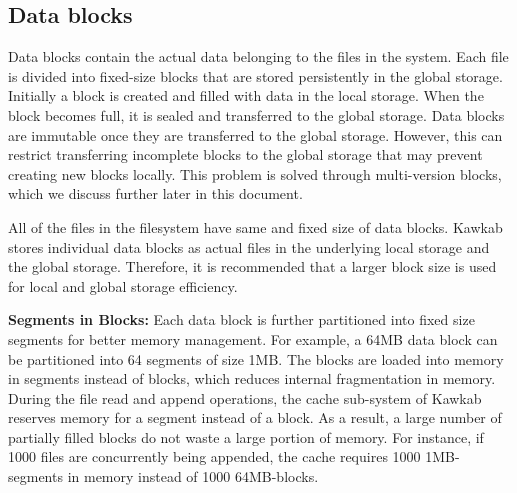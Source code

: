 \documentclass[]{article}
\newcommand{\subtopic}[1]{\vspace{1.5pt} \noindent \textbf{#1}}
\begin{document}



\subsection{Data blocks}

Data blocks contain the actual data belonging to the files in the system.
Each file is divided into fixed-size blocks that are stored persistently in
the global storage. Initially a block is created and filled with data
in the local storage. When the block becomes full, it is sealed and transferred 
to the global storage. Data blocks are immutable once they are transferred
to the global storage. However, this can restrict transferring incomplete
blocks to the global storage that may prevent creating new blocks locally.
This problem is solved through multi-version blocks, which we discuss
further later in this document.

All of the files in the filesystem have same and fixed size of data blocks. 
Kawkab stores individual data blocks as actual files in the underlying 
local storage and the global storage. Therefore, it is recommended that 
a larger block size is used for local and global 
storage efficiency. 

\subtopic{Segments in Blocks:} Each data block is further partitioned into
fixed size segments for better memory management. For example, a 64MB data
block can be partitioned into 64 segments of size 1MB.  
The blocks are loaded into memory in segments instead of blocks, which reduces internal
fragmentation in memory.  During the file read and append operations, the cache
sub-system of Kawkab reserves memory for a segment instead of a block. As a
result, a large number of partially filled blocks do not waste a large portion
of memory. For instance, if 1000 files are concurrently being appended, the
cache requires 1000 1MB-segments in memory instead of 1000 64MB-blocks.
\end{document}
